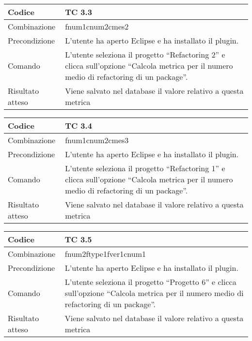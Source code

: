 \begin{table}[ht]
\begin{tabular}{|p{3cm}|p{9cm}|}
\hline
\cellcolor{lightgray}Codice				& TC 3.3								\\
\hline
\cellcolor{lightgray}Combinazione		& fnum1cnum2cmes2									\\
\hline
\cellcolor{lightgray}Precondizione		& L'utente ha aperto Eclipse e ha installato il plugin.					\\
\hline
\cellcolor{lightgray}Comando			& L'utente seleziona il progetto ``Refactoring 2''  e clicca sull'opzione ``Calcola metrica per il numero medio di refactoring di un package''.	\\
\hline
\cellcolor{lightgray}Risultato atteso	& Viene salvato nel database il valore relativo a questa metrica	\\
\hline
\end{tabular}
\end{table}

\begin{table}[ht]
\begin{tabular}{|p{3cm}|p{9cm}|}
\hline
\cellcolor{lightgray}Codice				& TC 3.4								\\
\hline
\cellcolor{lightgray}Combinazione		& fnum1cnum2cmes3									\\
\hline
\cellcolor{lightgray}Precondizione		& L'utente ha aperto Eclipse e ha installato il plugin.			\\
\hline
\cellcolor{lightgray}Comando			& L'utente seleziona il progetto ``Refactoring 1''  e clicca sull'opzione ``Calcola metrica per il numero medio di refactoring di un package''.	\\
\hline
\cellcolor{lightgray}Risultato atteso	& Viene salvato nel database il valore relativo a questa metrica	\\
\hline
\end{tabular}
\end{table}

\begin{table}[ht]
\begin{tabular}{|p{3cm}|p{9cm}|}
\hline
\cellcolor{lightgray}Codice				& TC 3.5								\\
\hline
\cellcolor{lightgray}Combinazione		& fnum2ftype1fver1cnum1 									\\
\hline
\cellcolor{lightgray}Precondizione		& L'utente ha aperto Eclipse e ha installato il plugin.			\\
\hline
\cellcolor{lightgray}Comando			& L'utente seleziona il progetto ``Progetto 6''  e clicca sull'opzione ``Calcola metrica per il numero medio di refactoring di un package''.	\\
\hline
\cellcolor{lightgray}Risultato atteso	& Viene salvato nel database il valore relativo a questa metrica	\\
\hline
\end{tabular}
\end{table}

